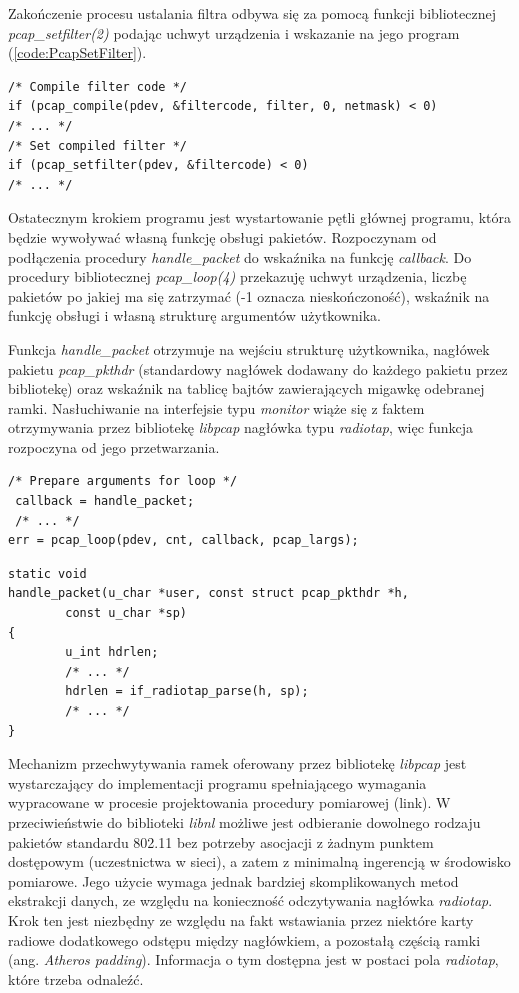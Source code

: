 Zakończenie procesu ustalania filtra odbywa się za pomocą funkcji bibliotecznej \emph{pcap\_setfilter(2)} podając uchwyt urządzenia i wskazanie na jego program (\ref{code:PcapSetFilter}).

\begin{lstlisting}[frame=tb]
/* Compile filter code */
if (pcap_compile(pdev, &filtercode, filter, 0, netmask) < 0)
/* ... */
/* Set compiled filter */ 
if (pcap_setfilter(pdev, &filtercode) < 0)
/* ... */
\end{lstlisting}

Ostatecznym krokiem programu jest wystartowanie pętli głównej programu, która będzie wywoływać własną funkcję obsługi pakietów. Rozpoczynam od podłączenia procedury \emph{handle\_packet} do wskaźnika na funkcję \emph{callback}. Do procedury bibliotecznej \emph{pcap\_loop(4)} przekazuję uchwyt urządzenia, liczbę pakietów po jakiej ma się zatrzymać (-1 oznacza nieskończoność), wskaźnik na funkcję obsługi i własną strukturę argumentów użytkownika. 

Funkcja \emph{handle\_packet} otrzymuje na wejściu strukturę użytkownika, nagłówek pakietu \emph{pcap\_pkthdr} (standardowy nagłówek dodawany do każdego pakietu przez bibliotekę) oraz wskaźnik na tablicę bajtów zawierających migawkę odebranej ramki. Nasłuchiwanie na interfejsie typu \emph{monitor} wiąże się z faktem otrzymywania przez bibliotekę \emph{libpcap} nagłówka typu \emph{radiotap}, więc funkcja rozpoczyna od jego przetwarzania. 


\begin{lstlisting}[frame=tb]
 /* Prepare arguments for loop */
 callback = handle_packet;
 /* ... */
err = pcap_loop(pdev, cnt, callback, pcap_largs);
\end{lstlisting}

\begin{lstlisting}[frame=tb]
static void
handle_packet(u_char *user, const struct pcap_pkthdr *h, 
        const u_char *sp)
{
        u_int hdrlen;
        /* ... */
        hdrlen = if_radiotap_parse(h, sp);
        /* ... */
}
\end{lstlisting}

Mechanizm przechwytywania ramek oferowany przez bibliotekę \emph{libpcap} jest wystarczający do implementacji programu spełniającego wymagania wypracowane w procesie projektowania procedury pomiarowej (link). W przeciwieństwie do biblioteki \emph{libnl} możliwe jest odbieranie dowolnego rodzaju pakietów standardu 802.11 bez potrzeby asocjacji z żadnym punktem dostępowym (uczestnictwa w sieci), a zatem z minimalną ingerencją w środowisko pomiarowe. Jego użycie wymaga jednak bardziej skomplikowanych metod ekstrakcji danych, ze względu na konieczność odczytywania nagłówka \emph{radiotap}. Krok ten jest niezbędny ze względu na fakt wstawiania przez niektóre karty radiowe dodatkowego odstępu między nagłówkiem, a pozostałą częścią ramki (ang. \emph{Atheros padding}). Informacja o tym dostępna jest w postaci pola \emph{radiotap}, które trzeba odnaleźć.

